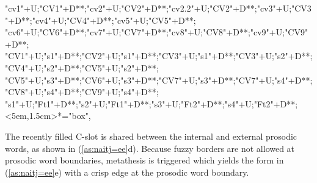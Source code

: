 \begin{multicols}{2}
\begin{exe}
{\begin{xlist}
{		"cv1"+U;"CV1"+D**\dir{-};"cv2"+U;"CV2"+D**\dir{-};"cv2.2"+U;"CV2"+D**\dir{-};"cv3"+U;"CV3"+D**\dir{-};"cv4"+U;"CV4"+D**\dir{-};"cv5"+U;"CV5"+D**\dir{-};
		"cv6"+U;"CV6"+D**\dir{-};"cv7"+U;"CV7"+D**\dir{};"cv8"+U;"CV8"+D**\dir{-};"cv9"+U;"CV9"+D**\dir{};
		"CV1"+U;"s1"+D**\dir{-};"CV2"+U;"s1"+D**\dir{-};"CV3"+U;"s1"+D**\dir{-};"CV3"+U;"s2"+D**\dir{-};"CV4"+U;"s2"+D**\dir{-};"CV5"+U;"s2"+D**\dir{-};
		"CV5"+U;"s3"+D**\dir{-};"CV6"+U;"s3"+D**\dir{-};"CV7"+U;"s3"+D**\dir{-};"CV7"+U;"s4"+D**\dir{-};"CV8"+U;"s4"+D**\dir{-};"CV9"+U;"s4"+D**\dir{-};
		"s1"+U;"Ft1"+D**\dir{-};"s2"+U;"Ft1"+D**\dir{-};"s3"+U;"Ft2"+D**\dir{-};"s4"+U;"Ft2"+D**\dir{-};
		<5em,1.5cm>*="box",
	\endxy}\label{as:naitj=ee2}
	\end{xlist}}
\end{exe}
\end{multicols}

The recently filled C-slot is shared between the internal and external prosodic
words, as shown in (\ref{as:naitj=ee}d).
Because fuzzy borders are not allowed at prosodic word boundaries,
metathesis is triggered which yields the form in (\ref{as:naitj=ee}e)
with a crisp edge at the prosodic word boundary.

